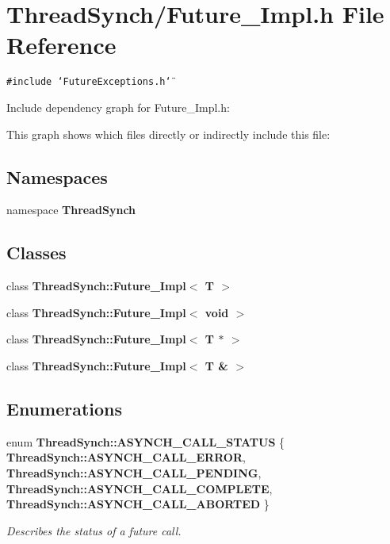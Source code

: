 \section{Thread\-Synch/Future\_\-Impl.h File Reference}
\label{_future___impl_8h}
{\tt \#include \char`\"{}Future\-Exceptions.h\char`\"{}}\par


Include dependency graph for Future\_\-Impl.h:

This graph shows which files directly or indirectly include this file:\subsection*{Namespaces}
\begin{CompactItemize}
\item 
namespace {\bf Thread\-Synch}
\end{CompactItemize}
\subsection*{Classes}
\begin{CompactItemize}
\item 
class {\bf Thread\-Synch::Future\_\-Impl$<$ T $>$}
\item 
class {\bf Thread\-Synch::Future\_\-Impl$<$ void $>$}
\item 
class {\bf Thread\-Synch::Future\_\-Impl$<$ T $\ast$ $>$}
\item 
class {\bf Thread\-Synch::Future\_\-Impl$<$ T \& $>$}
\end{CompactItemize}
\subsection*{Enumerations}
\begin{CompactItemize}
\item 
enum {\bf Thread\-Synch::ASYNCH\_\-CALL\_\-STATUS} \{ {\bf Thread\-Synch::ASYNCH\_\-CALL\_\-ERROR}, 
{\bf Thread\-Synch::ASYNCH\_\-CALL\_\-PENDING}, 
{\bf Thread\-Synch::ASYNCH\_\-CALL\_\-COMPLETE}, 
{\bf Thread\-Synch::ASYNCH\_\-CALL\_\-ABORTED}
 \}
\begin{CompactList}\small\item\em Describes the status of a future call. \item\end{CompactList}\end{CompactItemize}
